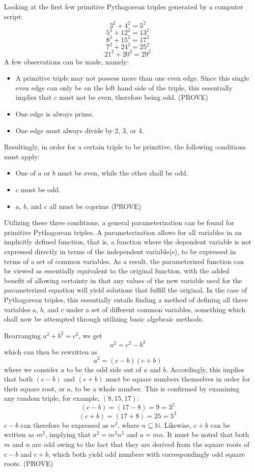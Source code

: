 \documentclass[11pt]{article}
\begin{document}
Looking at the first few primitive Pythagorean triples generated by a computer script:
$$3^2+4^2=5^2$$
$$5^2+12^2=13^2$$
$$8^2+15^2=17^2$$
$$7^2+24^2=25^2$$
$$21^2+20^2=29^2$$
A few observations can be made, namely:
\begin{itemize}
  \item A primitive triple may not possess more than one even edge. Since this single even edge can only be on the left hand side of the triple, this essentially implies that $c$ must not be even, therefore being odd. (PROVE)
  \item One edge is always prime. 
  \item One edge must always divide by 2, 3, or 4.
\end{itemize}
Resultingly, in order for a certain triple to be primitive, the following conditions must apply:
\begin{itemize}
  \item One of $a$ or $b$ must be even, while the other shall be odd.
  \item $c$ must be odd.
  \item $a$, $b$, and $c$ all must be coprime (PROVE)
\end{itemize}
Utilizing these three conditions, a general parameterization can be found for primitive Pythagorean triples. A parameterization allows for all variables in an implicitly defined function, that is, a function where the dependent variable is not expressed directly in terms of the independent variable(s), to be expressed in terms of a set of common variables. As a result, the parameterized function can be viewed as essentially equivalent to the original function, with the added benefit of allowing certainty in that any values of the new variable used for the parameterized equation will yield solutions that fulfill the original. In the case of Pythagorean triples, this essentially entails finding a method of defining all three variables $a$, $b$, and $c$ under a set of different common variables, something which shall now be attempted through utilizing basic algebraic methods.

Rearranging $a^2+b^2=c^2$, we get
$$a^2=c^2-b^2$$
which can then be rewritten as 
$$a^2=(c-b)(c+b)$$
where we consider $a$ to be the odd side out of $a$ and $b$.
Accordingly, this implies that both $(c-b)$ and $(c+b)$ must be square numbers themselves in order for their square root, or $a$, to be a whole number. This is confirmed by examining any random triple, for example, $(8, 15, 17)$:
$$(c-b)=(17-8)=9=3^2$$
$$(c+b)=(17+8)=25=5^2$$
$c-b$ can therefore be expressed as $n^2$, where $n\subseteq{\mathbb{N}}$.
Likewise, $c+b$ can be written as $m^2$, implying that $a^2=m^2n^2$ and $a=mn$. It must be noted that both $m$ and $n$ are odd owing to the fact that they are derived from the square roots of $c-b$ and $c+b$, which both yield odd numbers with correspondingly odd square roots. (PROVE)
\end{document}
